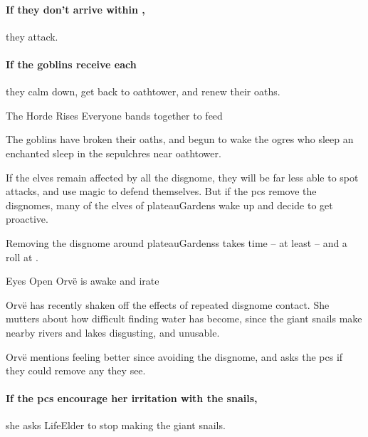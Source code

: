 \begin{multicols}{2}

\paragraph{If they don't arrive within ,}
they attack.

\paragraph{If the goblins receive  each}
they calm down, get back to \gls{oathtower}, and renew their oaths.


{The Horde Rises}%
{Everyone bands together to feed}%

The goblins have broken their oaths, and begun to wake the \glspl{ogre} who sleep an enchanted sleep in the \glspl{sepulchre} near \gls{oathtower}.

\goblin


\noindent
If the elves remain affected by all the \gls{disgnome}, they will be far less able to spot attacks, and use magic to defend themselves.
But if the \glspl{pc} remove the \glspl{disgnome},
many of the elves of \gls{plateauGardens} wake up and decide to get proactive.

Removing the \gls{disgnome} around \glspl{plateauGardens} takes time -- at least  -- and a  roll at \tn[10].

\setcounter{segNo}{-1}

{Eyes Open}%
{Orv\"e is awake and irate}%

Orv\"e has recently shaken off the effects of repeated \gls{disgnome} contact.
She mutters about how difficult finding water has become, since the giant snails make nearby rivers and lakes disgusting, and unusable.

Orv\"e mentions feeling better since avoiding the \gls{disgnome}, and asks the \glspl{pc} if they could remove any they see.


\paragraph{If the \glspl{pc} encourage her irritation with the snails,}
she asks \gls{LifeElder} to stop making the giant snails.


\end{multicols}
